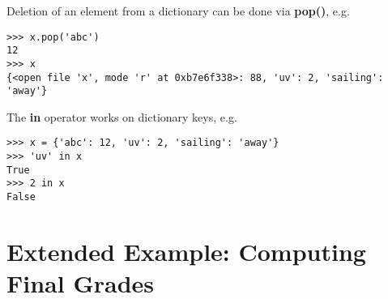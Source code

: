 Deletion of an element from a dictionary can be done via {\bf pop()}, e.g.

\begin{Verbatim}[fontsize=\relsize{-2}]
>>> x.pop('abc')
12
>>> x
{<open file 'x', mode 'r' at 0xb7e6f338>: 88, 'uv': 2, 'sailing': 'away'}
\end{Verbatim}

The {\bf in} operator works on dictionary keys, e.g.

\begin{Verbatim}[fontsize=\relsize{-2}]
>>> x = {'abc': 12, 'uv': 2, 'sailing': 'away'}
>>> 'uv' in x
True
>>> 2 in x
False
\end{Verbatim}

\section{Extended Example:  Computing Final Grades}

